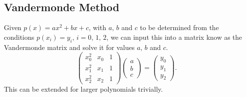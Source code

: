 \documentclass{article}
\begin{document}
\subsection{Vandermonde Method}
Given $p(x)=ax^2+bx+c$, with $a,\,b$ and $c$ to be determined from the conditions $p(x_i)=y_i,\, i=0,\,1,\,2$, we can input this into a matrix know as the Vandermonde matrix and solve it for values $a,\,b$ and $c$.
\begin{equation}
    \begin{pmatrix}  x_0^2 & x_0 & 1 \\ x_1^2 & x_1 & 1 \\ x_2^2 & x_2 & 1 \end{pmatrix}\begin{pmatrix} a \\ b \\ c \end{pmatrix} = \begin{pmatrix} y_0 \\ y_1 \\ y_2 \end{pmatrix}.
\end{equation}
This can be extended for larger polynomials trivially.
\end{document}
